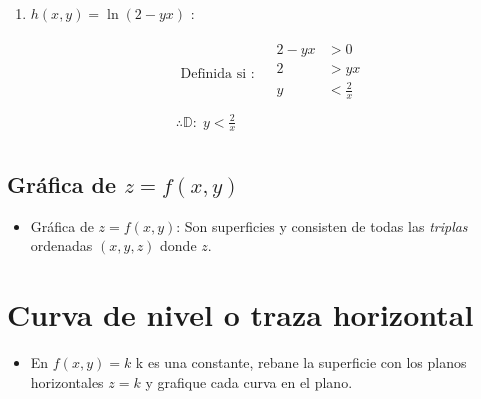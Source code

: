 \begin{enumerate}
    \item $h(x,y)=\ln(2-yx)$ : 
        \begin{center}
           \begin{align*}
               \text{  Definida si  }: \quad \begin{matrix}
                   2-yx &> 0 \\ 
                   2 &> yx \\ 
                   y &< \frac{2}{x} \\ 
               \end{matrix} \\ 
               \therefore \mathbb{D}: \; y < \frac{2}{x} \\ 
           \end{align*}
        \end{center}
\end{enumerate}


\subsection{Gráfica de $z=f(x,y)$}
\begin{itemize}
    \item Gráfica de $z=f(x,y)$: Son superficies y consisten de todas las \emph{triplas} ordenadas $(x,y,z)$ donde $z$.
\end{itemize}



\section{Curva de nivel o traza horizontal}
\begin{itemize}
    \item En $f(x,y)=k$ k es una constante, rebane la superficie con los planos horizontales $z=k$ y grafique cada curva en el plano.
\end{itemize}



















    
% 
